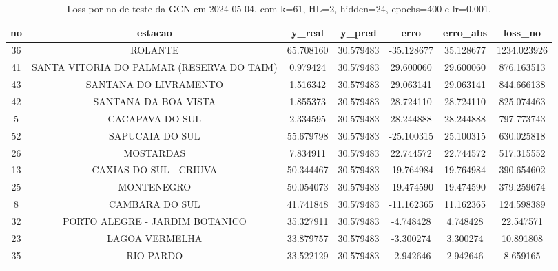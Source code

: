 \begin{table}[h]
\centering
\caption{Loss por no de teste da GCN em 2024-05-04, com k=61, HL=2, hidden=24, epochs=400 e lr=0.001.}
\label{tab:gcn_loss_k61_hl2_h24_e400_d20240504}
\begin{tabular}{ccccccc}
\toprule
no & estacao & y\_real & y\_pred & erro & erro\_abs & loss\_no \\
\midrule
36 & ROLANTE & 65.708160 & 30.579483 & -35.128677 & 35.128677 & 1234.023926 \\
41 & SANTA VITORIA DO PALMAR (RESERVA DO TAIM) & 0.979424 & 30.579483 & 29.600060 & 29.600060 & 876.163513 \\
43 & SANTANA DO LIVRAMENTO & 1.516342 & 30.579483 & 29.063141 & 29.063141 & 844.666138 \\
42 & SANTANA DA BOA VISTA & 1.855373 & 30.579483 & 28.724110 & 28.724110 & 825.074463 \\
5 & CACAPAVA DO SUL & 2.334595 & 30.579483 & 28.244888 & 28.244888 & 797.773743 \\
52 & SAPUCAIA DO SUL & 55.679798 & 30.579483 & -25.100315 & 25.100315 & 630.025818 \\
26 & MOSTARDAS & 7.834911 & 30.579483 & 22.744572 & 22.744572 & 517.315552 \\
13 & CAXIAS DO SUL - CRIUVA & 50.344467 & 30.579483 & -19.764984 & 19.764984 & 390.654602 \\
25 & MONTENEGRO & 50.054073 & 30.579483 & -19.474590 & 19.474590 & 379.259674 \\
8 & CAMBARA DO SUL & 41.741848 & 30.579483 & -11.162365 & 11.162365 & 124.598389 \\
32 & PORTO ALEGRE - JARDIM BOTANICO & 35.327911 & 30.579483 & -4.748428 & 4.748428 & 22.547571 \\
23 & LAGOA VERMELHA & 33.879757 & 30.579483 & -3.300274 & 3.300274 & 10.891808 \\
35 & RIO PARDO & 33.522129 & 30.579483 & -2.942646 & 2.942646 & 8.659165 \\
\bottomrule
\end{tabular}
\end{table}
